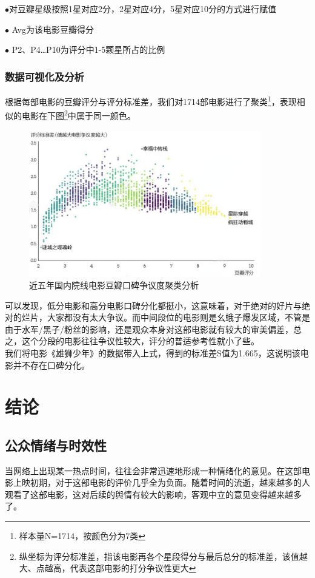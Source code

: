 \documentclass[12pt,a4paper,utf8]{article}
\begin{document}
$\bullet$对豆瓣星级按照1星对应2分，2星对应4分，5星对应10分的方式进行赋值

$\bullet$ Avg为该电影豆瓣得分

$\bullet$ P2、P4…P10为评分中1-5颗星所占的比例 \\

\subsubsection{数据可视化及分析}
根据每部电影的豆瓣评分与评分标准差，我们对1714部电影进行了聚类\footnote{样本量N=1714，按颜色分为7类}，表现相似的电影在下图\footnote{纵坐标为评分标准差，指该电影再各个星段得分与最后总分的标准差，该值越大、点越高，代表这部电影的打分争议性更大}中属于同一颜色。\\

\begin{figure}[H]
    \centering
    \includegraphics[width=0.9\textwidth]{images/评分标准差.jpg}
    \caption{近五年国内院线电影豆瓣口碑争议度聚类分析}
\end{figure}  

可以发现，低分电影和高分电影口碑分化都挺小，这意味着，对于绝对的好片与绝对的烂片，大家都没有太大争议。而中间段位的电影则是幺蛾子爆发区域，不管是由于水军/黑子/粉丝的影响，还是观众本身对这部电影就有较大的审美偏差，总之，这个分段的电影往往争议性较大，评分的普适参考性就小了些。\\

我们将电影《雄狮少年》的数据带入上式，得到的标准差S值为1.665，这说明该电影并不存在口碑分化。
 


\section{结论}
\subsection{公众情绪与时效性}
当网络上出现某一热点时间，往往会非常迅速地形成一种情绪化的意见。在这部电影上映初期，对于这部电影的评价几乎全为负面。随着时间的流逝，越来越多的人观看了这部电影，这对后续的舆情有较大的影响，客观中立的意见变得越来越多了。\\
\end{document}

